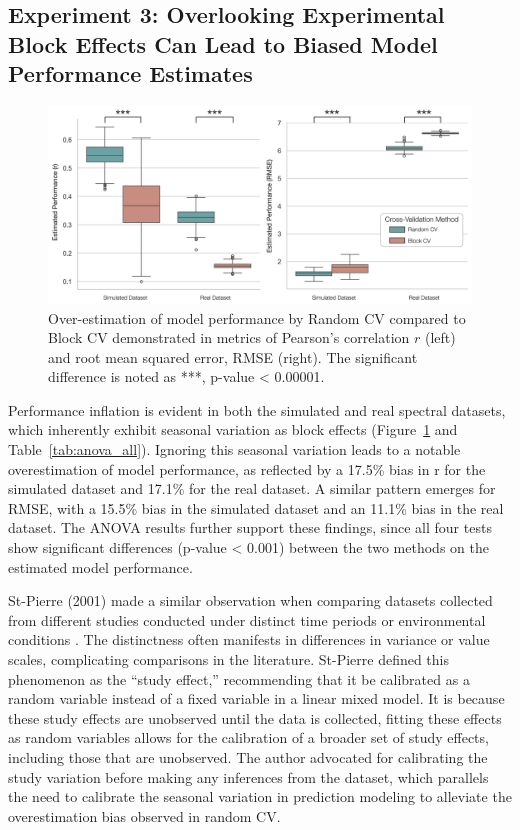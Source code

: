 \subsection{Experiment 3: Overlooking Experimental Block Effects Can Lead to Biased Model Performance Estimates}

\begin{figure}[H]
    \centering
    \includegraphics[width=1\textwidth]{fig_8.jpg}
    \caption{Over-estimation of model performance by Random CV compared to Block CV demonstrated in metrics of Pearson's correlation $r$ (left) and root mean squared error, RMSE (right). The significant difference is noted as ***, p-value < 0.00001.}
    \label{fig:s3_results}
\end{figure}

Performance inflation is evident in both the simulated and real spectral datasets, which inherently exhibit seasonal variation as block effects (Figure~\ref{fig:s3_results} and Table~\ref{tab:anova_all}). Ignoring this seasonal variation leads to a notable overestimation of model performance, as reflected by a 17.5\% bias in r for the simulated dataset and 17.1\% for the real dataset. A similar pattern emerges for RMSE, with a 15.5\% bias in the simulated dataset and an 11.1\% bias in the real dataset. The ANOVA results further support these findings, since all four tests show significant differences (p-value < 0.001) between the two methods on the estimated model performance.

St-Pierre (2001) made a similar observation when comparing datasets collected from different studies conducted under distinct time periods or environmental conditions \citep{st-pierre_invited_2001}. The distinctness often manifests in differences in variance or value scales, complicating comparisons in the literature. St-Pierre defined this phenomenon as the “study effect,” recommending that it be calibrated as a random variable instead of a fixed variable in a linear mixed model. It is because these study effects are unobserved until the data is collected, fitting these effects as random variables allows for the calibration of a broader set of study effects, including those that are unobserved. The author advocated for calibrating the study variation before making any inferences from the dataset, which parallels the need to calibrate the seasonal variation in prediction modeling to alleviate the overestimation bias observed in random CV.

